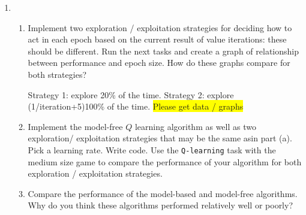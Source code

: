 \documentclass{article}
\newcommand{\edit}[1]{\colorbox{Yellow}{#1}}
\begin{document}
\begin{enumerate}
\begin{enumerate}
  \end{enumerate}

\item 
  \begin{enumerate}
  \item {Implement two exploration / exploitation strategies for deciding how to act
  in each epoch based on the current result of value iterations: these should be different.
  Run the next tasks and create a graph of relationship between performance and epoch
  size. How do these graphs compare for both strategies?}

  Strategy 1: explore 20\% of the time. Strategy 2: explore (1/iteration+5)100\% of the time. 
  \edit{Please get data / graphs}

  \item {Implement the model-free $Q$ learning algorithm as well as two exploration/
  exploitation strategies that may be the same asin part (a). Pick a learning rate. Write 
  code. Use the \texttt{Q-learning} task with the medium size game to compare the 
  performance of your algorithm for both exploration / exploitation strategies.}

  \item {Compare the performance of the model-based and model-free algorithms. Why 
  do you think these algorithms performed relatively well or poorly?}


  \end{enumerate}

\end{enumerate}
\end{document}
